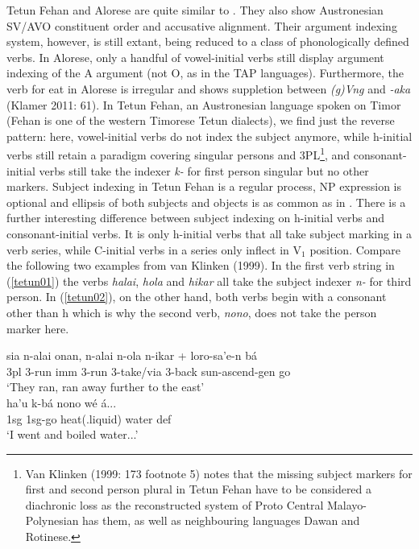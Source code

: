 Tetun Fehan and Alorese are quite similar to . They also show Austronesian SV/AVO constituent order and accusative alignment. Their argument indexing system, however, is still extant, being reduced to a class of phonologically defined verbs. In Alorese, only a handful of vowel-initial verbs still display argument indexing of the A argument (not O, as in the TAP languages). Furthermore, the verb for eat in Alorese is irregular and shows suppletion between \textit{(g)Vng} and \textit{-aka} (Klamer 2011: 61). In Tetun Fehan, an Austronesian language spoken on Timor (Fehan is one of the western Timorese Tetun dialects), we find just the reverse pattern: here, vowel-initial verbs do not index the subject anymore, while h-initial verbs still retain a paradigm covering singular persons and 3PL\footnote{Van Klinken (1999: 173 footnote 5) notes that the missing subject markers for first and second person plural in Tetun Fehan have to be considered a diachronic loss as the reconstructed system of Proto Central Malayo-Polynesian has them, as well as neighbouring languages Dawan and Rotinese.}, and consonant-initial verbs still take the indexer \textit{k-} for first person singular but no other markers. Subject indexing in Tetun Fehan is a regular process, NP expression is optional and ellipsis of both subjects and objects is as common as in . There is a further interesting difference between subject indexing on h-initial verbs and consonant-initial verbs. It is only h-initial verbs that all take subject marking in a verb series, while C-initial verbs in a series only inflect in V$_1$ position. Compare the following two examples from van Klinken (1999). In the first verb string in (\ref{tetun01}) the verbs \textit{halai}, \textit{hola} and \textit{hikar} all take the subject indexer \textit{n-} for third person. In (\ref{tetun02}), on the other hand, both verbs begin with a consonant other than h which is why the second verb, \textit{nono}, does not take the person marker here.

\ea \label{tetun01}
\gll sia n-alai onan, n-alai n-ola n-ikar + loro-sa'e-n bá \\
\acs{3}\acs{pl} \acs{3}-run \acs{imm} \acs{3}-run \acs{3}-take/via \acs{3}-back sun-ascend-\acs{gen} go \\
\glft `They ran, ran away further to the east' \\ 
\z
\xe
\ea \label{tetun02}
\gll ha'u k-bá nono wé á... \\
\acs{1}\acs{sg} \acs{1}\acs{sg}-go heat(.liquid) water \acs{def} \\
\glft `I went and boiled water...' \\ 
\z
\xe

